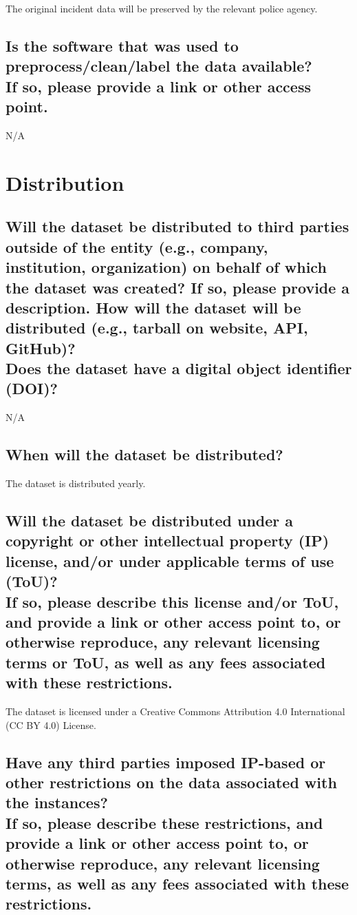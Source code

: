 \documentclass[letterpaper, 10 pt, conference]{ieeeconf}  %
\newcommand{\subtitle}[1]{{\\ \small \normalfont \color{purple} #1}}
\begin{document}
The original incident data will be preserved by the relevant police agency.

\subsection{Is the software that was used to preprocess/clean/label the data available? \subtitle{If so, please provide a link or other access point.}}

N/A

\section{Distribution}
\subsection{Will the dataset be distributed to third parties outside of the entity (e.g., company, institution, organization) on behalf of which the dataset was created? If so, please provide a description. How will the dataset will be distributed (e.g., tarball on website, API, GitHub)? \subtitle{Does the dataset have a digital object identifier (DOI)?}}

N/A

\subsection{When will the dataset be distributed?}

The dataset is distributed yearly.

\subsection{Will the dataset be distributed under a copyright or other intellectual property (IP) license, and/or under applicable terms of use (ToU)? \subtitle{If so, please describe this license and/or ToU, and provide a link or other access point to, or otherwise reproduce, any relevant licensing terms or ToU, as well as any fees associated with these restrictions.}}

The dataset is licensed under a Creative Commons Attribution 4.0 International (CC BY 4.0) License.

\subsection{Have any third parties imposed IP-based or other restrictions on the data associated with the instances? \subtitle{If so, please describe these restrictions, and provide a link or other access point to, or otherwise reproduce, any relevant licensing terms, as well as any fees associated with these restrictions.}}
\end{document}
